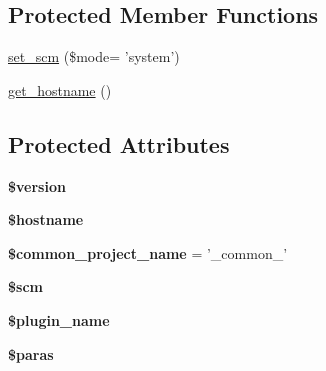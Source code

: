 \subsection*{Protected Member Functions}
\begin{DoxyCompactItemize}
\item 
\hyperlink{class_sldeploy_a82e49f81c7b6d1433872270f0065e339}{set\_\-scm} (\$mode= 'system')
\item 
\hyperlink{class_sldeploy_a38980f2b9e4c06a156136d9e0de6b212}{get\_\-hostname} ()
\end{DoxyCompactItemize}
\subsection*{Protected Attributes}
\begin{DoxyCompactItemize}
\item 
\hypertarget{class_sldeploy_a17c8948c68aa44fa9961ae169b6a8961}{
{\bfseries \$version}}
\label{class_sldeploy_a17c8948c68aa44fa9961ae169b6a8961}

\item 
\hypertarget{class_sldeploy_a8bf9ffb42ed554b203b55377d1fc9aa4}{
{\bfseries \$hostname}}
\label{class_sldeploy_a8bf9ffb42ed554b203b55377d1fc9aa4}

\item 
\hypertarget{class_sldeploy_a3170850828bcc6cb52f2b50eb01c2dca}{
{\bfseries \$common\_\-project\_\-name} = '\_\-common\_\-'}
\label{class_sldeploy_a3170850828bcc6cb52f2b50eb01c2dca}

\item 
\hypertarget{class_sldeploy_a6f7a4656a8d612174a9329139b049d91}{
{\bfseries \$scm}}
\label{class_sldeploy_a6f7a4656a8d612174a9329139b049d91}

\item 
\hypertarget{class_sldeploy_aebacc51188e2a01d35a6a6fe9161d0ce}{
{\bfseries \$plugin\_\-name}}
\label{class_sldeploy_aebacc51188e2a01d35a6a6fe9161d0ce}

\item 
\hypertarget{class_sldeploy_a8da817ab7bef44a909e4901d724ee402}{
{\bfseries \$paras}}
\label{class_sldeploy_a8da817ab7bef44a909e4901d724ee402}

\end{DoxyCompactItemize}


